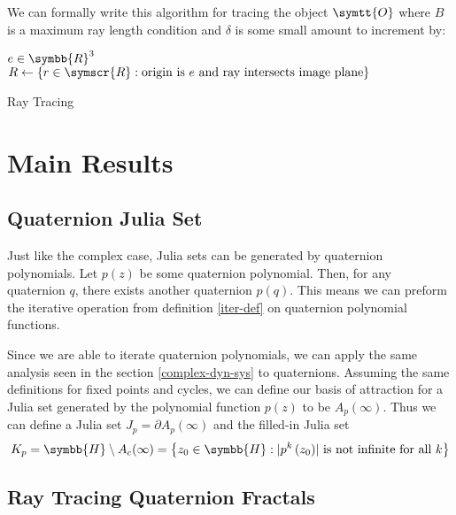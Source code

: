 \documentclass[11pt,hidelinks]{article}
\numberwithin{equation}{section} %
\DeclarePairedDelimiter\abs{\lvert}{\rvert} %
\theoremstyle{bf}
\theoremstyle{indentbf}
\begin{document}
We can formally write this algorithm for tracing the object \(\symtt{O}\) where \(B\) is a maximum ray length condition and \(\delta\) is some small amount to increment by:
\begin{algorithm}
$e \in \symbb{R}^3$
$R \gets \{ r \in \symscr{R} : \text{origin is } e \text{ and ray intersects image plane} \}$
\caption{Ray Tracing}
\end{algorithm}

\section{Main Results}
\label{sec:org5842904}

\subsection{Quaternion Julia Set}
\label{sec:org689aaed}

Just like the complex case, Julia sets can be generated by quaternion polynomials. Let \(p(z)\) be some quaternion polynomial. Then, for any quaternion \(q\), there exists another quaternion \(p(q)\). This means we can preform the iterative operation from definition \ref{iter-def} on quaternion polynomial functions.

Since we are able to iterate quaternion polynomials, we can apply the same analysis seen in the section \ref{complex-dyn-sys} to quaternions. Assuming the same definitions for fixed points and cycles, we can define our basis of attraction for a Julia set generated by the polynomial function \(p(z)\) to be \(A_p(\infty)\). Thus we can define a Julia set \(J_p = \partial A_p(\infty)\) and the filled-in Julia set
\begin{equation*}
    K_p = \symbb{H} \setminus A_c(\infty) = \left\{ z_0 \in \symbb{H}: \abs{p^k \left(z_0 \right)} \text{ is not infinite for all } k \right\}
\end{equation*}

\subsection{Ray Tracing Quaternion Fractals}
\label{sec:org16f4a11}
\end{document}
